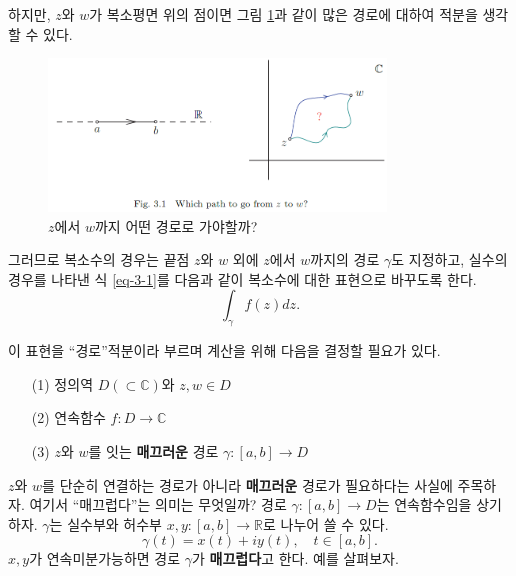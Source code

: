 하지만, $z$와 $w$가 복소평면 위의 점이면
그림 \ref{fig-3-1}과 같이 많은 경로에 대하여 적분을 생각할 수 있다.

\begin{figure}[!h]
\begin{center}
\includegraphics[width=0.8\textwidth]{./SaltChapter/fig-3-1}
\end{center}
\caption{$z$에서 $w$까지 어떤 경로로 가야할까?}
\label{fig-3-1}
\end{figure}

그러므로 복소수의 경우는 끝점 $z$와 $w$ 외에
$z$에서 $w$까지의 경로 $\gamma$도 지정하고,
실수의 경우를 나타낸 식 \eqref{eq-3-1}를
다음과 같이 복소수에 대한 표현으로 바꾸도록 한다.
\[
\int_\gamma f(z)dz.
\]

이 표현을 ``경로''적분이라 부르며
계산을 위해 다음을 결정할 필요가 있다.
\begin{itemize}
\item[(1)] 정의역  $D(\subset \mathbb C)$와 $z, w\in D$
\item[(2)] 연속함수 $f:D\to \mathbb C$
\item[(3)] $z$와 $w$를 잇는 {\bf 매끄러운} 경로 $\gamma: [a,b] \to D$
\end{itemize}

$z$와 $w$를 단순히 연결하는 경로가 아니라  {\bf 매끄러운} 경로가
필요하다는 사실에 주목하자.
여기서 ``매끄럽다''는 의미는 무엇일까?
경로 $\gamma : [a,b] \to D$는 연속함수임을 상기하자.
$\gamma$는 실수부와 허수부 $x,y: [a,b] \to \mathbb R$로 나누어  쓸 수 있다.
\[
\gamma(t) = x(t) + iy(t), \quad t\in [a,b].
\]
$x, y$가 연속미분가능하면
경로 $\gamma$가 {\bf 매끄럽다}고 한다.
예를 살펴보자.

